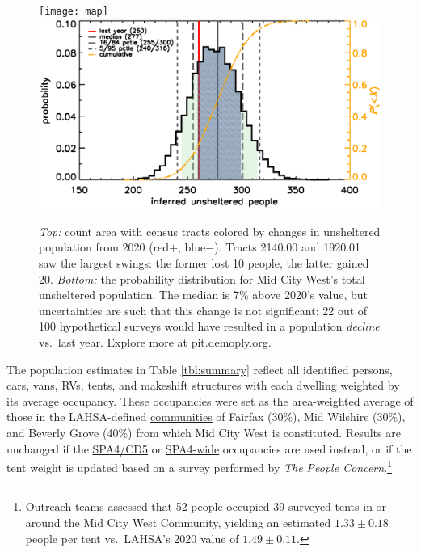 \documentclass[11pt]{article}
\begin{document}
\begin{figure}
	\centering
	\texttt{[image: map]}
	\includegraphics[width=\linewidth, trim = 0cm 0cm 0cm 0cm]{mcw2021Hist}
	\caption{{\it Top:} count area with census tracts colored by  
			changes in unsheltered population from 2020 (red$+$, blue$-$).
			Tracts 2140.00 and 1920.01 saw the largest swings: the former lost
			10 people, the latter gained 20. 
			{\it Bottom:} the probability distribution for Mid City West's total unsheltered 
			population. The median is 7\% above 2020's value, but uncertainties 
			are such that this change is not significant: 22 out of 100 hypothetical surveys
			would have resulted in a population {\it decline} vs.~last year.
			Explore more at \href{https://pit.demoply.org}{pit.demoply.org}.}
	\label{fig:tcomp}
\end{figure} 

 The population estimates in Table \ref{tbl:summary} reflect all 
identified persons, cars, vans, RVs, tents, and makeshift structures with each
dwelling weighted by its average occupancy. These occupancies were set as the area-weighted 
average of those in the LAHSA-defined 
\href{https://www.lahsa.org/documents?id=4686-2020-greater-los-angeles-city-community-homelessness-report-service-planning-area-4.pdf}{communities} of Fairfax (30\%), Mid Wilshire (30\%), and 
Beverly Grove (40\%) from which Mid City West is constituted. Results are unchanged if 
the \href{https://www.lahsa.org/documents?id=4635-usc-2018-2020-multipliers-and-estimates-overview}
{SPA4/CD5} or \href{https://www.lahsa.org/documents?id=4693-2020-greater-los-angeles-homeless-count-cvrtm-conversion-factors}{SPA4-wide} occupancies are used instead, or if the tent weight is 
updated based on a survey performed by {\it The People Concern}.\footnote{Outreach teams 
assessed that 52 people occupied 39 surveyed tents in or around the Mid City West Community,
yielding an estimated $1.33\pm0.18$ people per tent vs.~LAHSA's 2020 value of $1.49\pm0.11$.}
\end{document}
